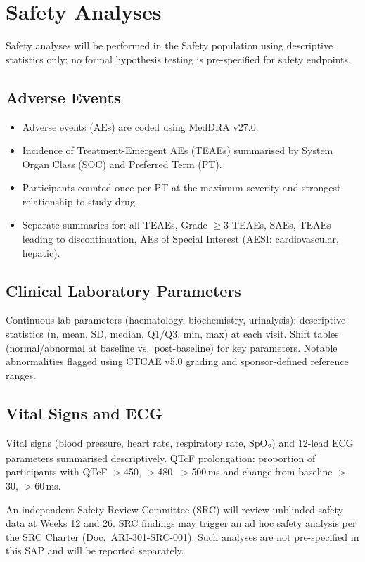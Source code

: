 \section{Safety Analyses}

Safety analyses will be performed in the Safety population using descriptive statistics
only; no formal hypothesis testing is pre-specified for safety endpoints.

\subsection{Adverse Events}

\begin{itemize}[leftmargin=1.6em, itemsep=2pt]
  \item Adverse events (AEs) are coded using MedDRA v27.0.
  \item Incidence of Treatment-Emergent AEs (TEAEs) summarised by System Organ Class
        (SOC) and Preferred Term (PT).
  \item Participants counted once per PT at the maximum severity and strongest relationship
        to study drug.
  \item Separate summaries for: all TEAEs, Grade $\geq$3 TEAEs, SAEs, TEAEs leading to
        discontinuation, AEs of Special Interest (AESI: cardiovascular, hepatic).
\end{itemize}

\subsection{Clinical Laboratory Parameters}

Continuous lab parameters (haematology, biochemistry, urinalysis): descriptive statistics
(n, mean, SD, median, Q1/Q3, min, max) at each visit. Shift tables (normal/abnormal at
baseline vs.\ post-baseline) for key parameters. Notable abnormalities flagged using
CTCAE v5.0 grading and sponsor-defined reference ranges.

\subsection{Vital Signs and ECG}

Vital signs (blood pressure, heart rate, respiratory rate, SpO\textsubscript{2}) and
12-lead ECG parameters summarised descriptively. QTcF prolongation: proportion of
participants with QTcF $>$450, $>$480, $>$500\,ms and change from baseline $>$30, $>$60\,ms.

\begin{tcolorbox}[sapwarn, title={\faIcon{exclamation-triangle}\ Safety Review Committee Note}]
  An independent Safety Review Committee (SRC) will review unblinded safety data at
  Weeks 12 and 26. SRC findings may trigger an ad hoc safety analysis per the SRC
  Charter (Doc.\ ARI-301-SRC-001). Such analyses are not pre-specified in this SAP
  and will be reported separately.
\end{tcolorbox}

\clearpage

